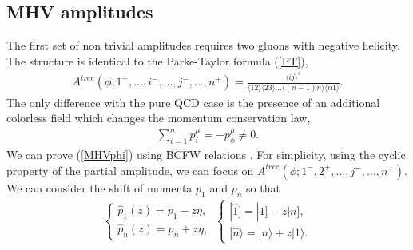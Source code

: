 \subsection{MHV amplitudes} \label{MHVsection}
The first set of non trivial amplitudes requires two gluons with negative helicity. The structure is identical to the Parke-Taylor formula (\ref{PT}),
\begin{align}
	A^{tree}(\phi;1^+,\dots, i^-,\dots, j^-, \dots, n^+)=\frac{\langle ij \rangle^4}{\langle 12 \rangle \langle 2 3\rangle \dots \langle (n-1)n\rangle\langle n 1 \rangle}.	\label{MHVphi}
\end{align}
The only difference with the pure QCD case is the presence of an additional colorless field which changes the momentum conservation law,
\begin{align*}
	\sum_{i=1}^n p_i^\mu=-p_\phi^\mu\not =0.
\end{align*}
We can prove (\ref{MHVphi}) using BCFW relations \cite{Berger:2006sh}. For simplicity, using the cyclic property of the partial amplitude, we can focus on $A^{tree}(\phi;1^-,2^+,\dots, j^-, \dots, n^+)$.
We can consider the shift of momenta $p_1$ and $p_n$ so that
\begin{align}
	\begin{cases}
		\hat p_1(z)=p_1-z\eta,\\
		\hat p_n(z)=p_n+z\eta,
	\end{cases}\,
	\begin{cases}
		| \hat 1 ] = | 1] - z | n ],\\
		| \hat n \rangle = | n \rangle + z | 1 \rangle.
	\end{cases}
	\label{shift}
\end{align}


